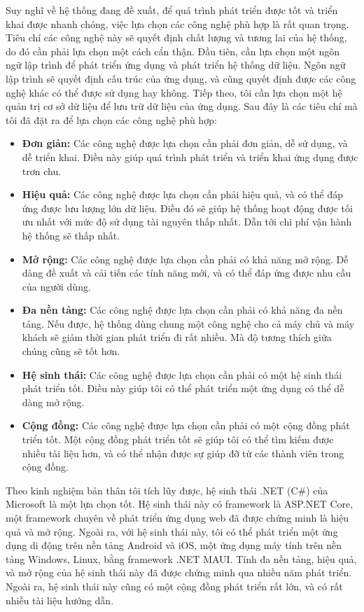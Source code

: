\documentclass[../DoAn.tex]{subfiles}
\begin{document}
Suy nghĩ về hệ thống đang đề xuất, để quá trình phát triển được tốt và triển khai được nhanh chóng, việc lựa chọn các công nghệ phù hợp là rất quan trọng. Tiêu chí các công nghệ này sẽ quyết định chất lượng và tương lai của hệ thống, do đó cần phải lựa chọn một cách cẩn thận. Đầu tiên, cần lựa chọn một ngôn ngữ lập trình để phát triển ứng dụng và phát triển hệ thống dữ liệu. Ngôn ngữ lập trình sẽ quyết định cấu trúc của ứng dụng, và cũng quyết định được các công nghệ khác có thể được sử dụng hay không. Tiếp theo, tôi cần lựa chọn một hệ quản trị cơ sở dữ liệu để lưu trữ dữ liệu của ứng dụng. Sau đây là các tiêu chí mà tôi đã đặt ra để lựa chọn các công nghệ phù hợp:
\begin{itemize}
    \item \textbf{Đơn giản:} Các công nghệ được lựa chọn cần phải đơn giản, dễ sử dụng, và dễ triển khai. Điều này giúp quá trình phát triển và triển khai ứng dụng được trơn chu.
    \item \textbf{Hiệu quả:} Các công nghệ được lựa chọn cần phải hiệu quả, và có thể đáp ứng được lưu lượng lớn dữ liệu. Điều đó sẽ giúp hệ thống hoạt động được tối ưu nhất với mức độ sử dụng tài nguyên thấp nhất. Dẫn tới chi phí vận hành hệ thống sẽ thấp nhất.
    \item \textbf{Mở rộng:} Các công nghệ được lựa chọn cần phải có khả năng mở rộng. Dễ dàng đề xuất và cải tiến các tính năng mới, và có thể đáp ứng được nhu cầu của người dùng.
    \item \textbf{Đa nền tảng:} Các công nghệ được lựa chọn cần phải có khả năng đa nền tảng. Nếu được, hệ thống dùng chung một công nghệ cho cả máy chủ và máy khách sẽ giảm thời gian phát triển đi rất nhiều. Mà độ tương thích giữa chúng cũng sẽ tốt hơn.
    \item \textbf{Hệ sinh thái:} Các công nghệ được lựa chọn cần phải có một hệ sinh thái phát triển tốt. Điều này giúp tôi có thể phát triển một ứng dụng có thể dễ dàng mở rộng.
    \item \textbf{Cộng đồng:} Các công nghệ được lựa chọn cần phải có một cộng đồng phát triển tốt. Một cộng đồng phát triển tốt sẽ giúp tôi có thể tìm kiếm được nhiều tài liệu hơn, và có thể nhận được sự giúp đỡ từ các thành viên trong cộng đồng.
\end{itemize}

Theo kinh nghiệm bản thân tôi tích lũy được, hệ sinh thái .NET (C\#) của Microsoft là một lựa chọn tốt. Hệ sinh thái này có framework là ASP.NET Core, một framework chuyên về phát triển ứng dụng web đã được chứng minh là hiệu quả và mở rộng. Ngoài ra, với hệ sinh thái này, tôi có thể phát triển một ứng dụng di động trên nền tảng Android và iOS, một ứng dụng máy tính trên nền tảng Windows, Linux, bằng framework .NET MAUI. Tính đa nền tảng, hiệu quả, và mở rộng của hệ sinh thái này đã được chứng minh qua nhiều năm phát triển. Ngoài ra, hệ sinh thái này cũng có một cộng đồng phát triển rất lớn, và có rất nhiều tài liệu hướng dẫn.
\end{document}
